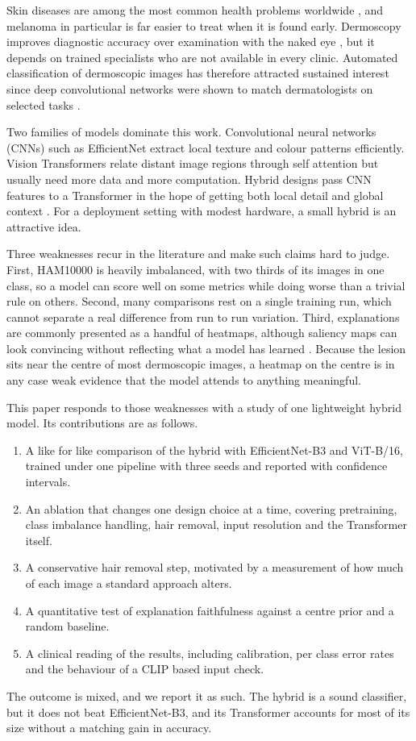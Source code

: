 \documentclass[runningheads]{llncs}
\begin{document}
Skin diseases are among the most common health problems worldwide \cite{hay2014}, and melanoma in particular is far easier to treat when it is found early. Dermoscopy improves diagnostic accuracy over examination with the naked eye \cite{vestergaard2008}, but it depends on trained specialists who are not available in every clinic. Automated classification of dermoscopic images has therefore attracted sustained interest since deep convolutional networks were shown to match dermatologists on selected tasks \cite{esteva2017}.

Two families of models dominate this work. Convolutional neural networks (CNNs) such as EfficientNet \cite{tan2019} extract local texture and colour patterns efficiently. Vision Transformers \cite{dosovitskiy2021} relate distant image regions through self attention \cite{vaswani2017} but usually need more data and more computation. Hybrid designs pass CNN features to a Transformer in the hope of getting both local detail and global context \cite{chen2021}. For a deployment setting with modest hardware, a small hybrid is an attractive idea.

Three weaknesses recur in the literature and make such claims hard to judge. First, HAM10000 \cite{tschandl2018} is heavily imbalanced, with two thirds of its images in one class, so a model can score well on some metrics while doing worse than a trivial rule on others. Second, many comparisons rest on a single training run, which cannot separate a real difference from run to run variation. Third, explanations are commonly presented as a handful of heatmaps, although saliency maps can look convincing without reflecting what a model has learned \cite{adebayo2018}. Because the lesion sits near the centre of most dermoscopic images, a heatmap on the centre is in any case weak evidence that the model attends to anything meaningful.

This paper responds to those weaknesses with a study of one lightweight hybrid model. Its contributions are as follows.
\begin{enumerate}
\item A like for like comparison of the hybrid with EfficientNet-B3 and ViT-B/16, trained under one pipeline with three seeds and reported with confidence intervals.
\item An ablation that changes one design choice at a time, covering pretraining, class imbalance handling, hair removal, input resolution and the Transformer itself.
\item A conservative hair removal step, motivated by a measurement of how much of each image a standard approach alters.
\item A quantitative test of explanation faithfulness against a centre prior and a random baseline.
\item A clinical reading of the results, including calibration, per class error rates and the behaviour of a CLIP based input check.
\end{enumerate}
The outcome is mixed, and we report it as such. The hybrid is a sound classifier, but it does not beat EfficientNet-B3, and its Transformer accounts for most of its size without a matching gain in accuracy.
\end{document}
